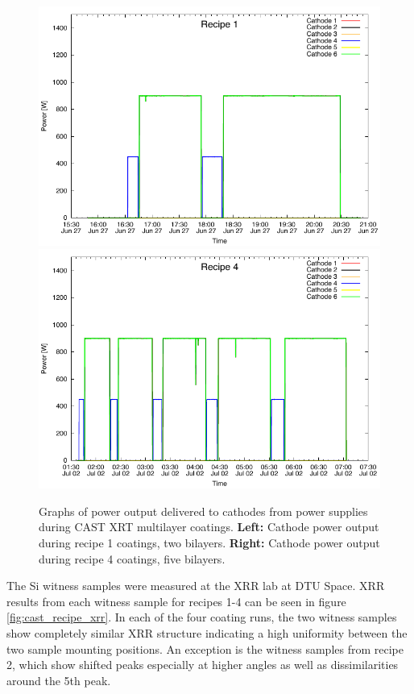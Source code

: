 \begin{figure}[htbp]
  \centering  \includegraphics[width=0.45\linewidth]{figures/cast/power_recipe1.pdf}  \includegraphics[width=0.45\linewidth]{figures/cast/power_recipe4.pdf}\\
  \caption{\footnotesize Graphs of power output delivered to cathodes from power supplies during CAST XRT multilayer coatings. \textbf{Left:} Cathode power output during recipe 1 coatings, two bilayers. \textbf{Right:} Cathode power output during recipe 4 coatings, five bilayers.}
  \label{fig:cast_coatings_power}
\end{figure}

The Si witness samples were measured at the XRR lab at DTU Space. XRR results from each witness sample for recipes 1-4 can be seen in figure \ref{fig:cast_recipe_xrr}. In each of the four coating runs, the two witness samples show completely similar XRR structure indicating a high uniformity between the two sample mounting positions. An exception is the witness samples from recipe 2, which show shifted peaks especially at higher angles as well as dissimilarities around the 5th peak.

